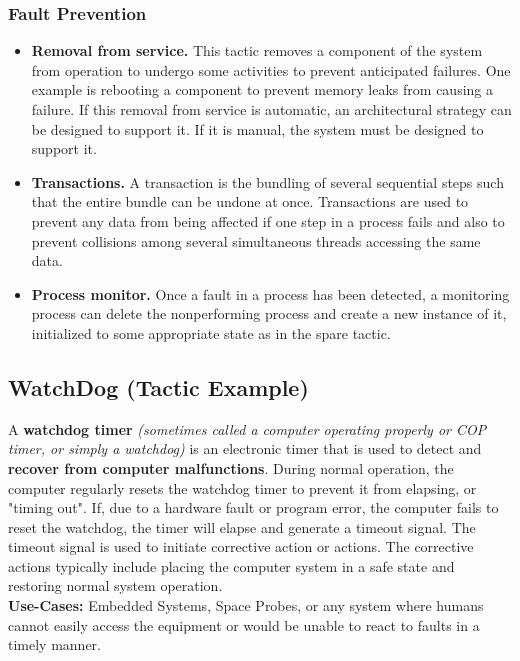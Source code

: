 \documentclass[a4paper]{article}
\begin{document}
\subsubsection{Fault Prevention}
\begin{itemize}
  \item
    \textbf{Removal from service.}
    This tactic removes a component of the system from operation to undergo some activities to prevent anticipated failures. One example is rebooting a component to prevent memory leaks from causing a failure. If this removal from service is automatic, an architectural strategy can be designed to support it. If it is manual, the system must be designed to support it.
  \item
    \textbf{Transactions.}
    A transaction is the bundling of several sequential steps such that the entire bundle can be undone at once. Transactions are used to prevent any data from being affected if one step in a process fails and also to prevent collisions among several simultaneous threads accessing the same data.
  \item
    \textbf{Process monitor.}
    Once a fault in a process has been detected, a monitoring process can delete the nonperforming process and create a new instance of it, initialized to some appropriate state as in the spare tactic.
  \end{itemize}


\subsection{WatchDog (Tactic Example)}
A \textbf{watchdog timer} \textit{(sometimes called a computer operating properly or COP timer, or simply a watchdog)} is an electronic timer that is used to detect and \textbf{recover from computer malfunctions}. During normal operation, the computer regularly resets the watchdog timer to prevent it from elapsing, or "timing out". If, due to a hardware fault or program error, the computer fails to reset the watchdog, the timer will elapse and generate a timeout signal. The timeout signal is used to initiate corrective action or actions. The corrective actions typically include placing the computer system in a safe state and restoring normal system operation.\\

\textbf{Use-Cases: } Embedded Systems, Space Probes, or any system where humans cannot easily access the equipment or would be unable to react to faults in a timely manner.
\end{document}
